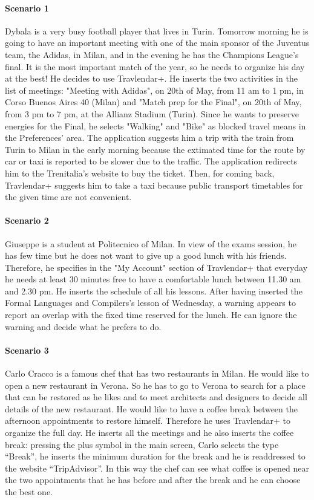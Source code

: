\documentclass[12pt,titlepage]{article}
\begin{document}
\paragraph{Scenario 1} 
Dybala is a very busy football player that lives in Turin. Tomorrow morning he is going to have an important meeting with one of the main sponsor of the Juventus team, the Adidas, in Milan, and in the evening he has the Champions League's final. It is the most important match of the year, so he needs to organize his day at the best! He decides to use Travlendar+. He inserts the two activities in the list of meetings: "Meeting with Adidas", on 20th of May, from 11 am to 1 pm, in Corso Buenos Aires 40 (Milan) and "Match prep for the Final", on 20th of May, from 3 pm to 7 pm, at the Allianz Stadium (Turin). Since he wants to preserve energies for the Final, he selects "Walking" and "Bike" as blocked travel means in the Preferences' area. The application suggests him a trip with the train from Turin to Milan in the early morning because the extimated time for the route by car or taxi is reported to be slower due to the traffic. The application redirects him to the Trenitalia's website to buy the ticket. Then, for coming back, Travlendar+ suggests him to take a taxi because public transport timetables for the given time are not convenient. 

\paragraph{Scenario 2}
Giuseppe is a student at Politecnico of Milan. In view of the exams session, he has few time but he does not want to give up a good lunch with his friends. Therefore, he specifies in the "My Account" section of Travlendar+ that everyday he needs at least 30 minutes free to have a comfortable lunch between 11.30 am and 2.30 pm. He inserts the schedule of all his lessons. After having inserted the Formal Languages and Compilers's lesson of Wednesday, a warning appears to report an overlap with the fixed time reserved for the lunch. He can ignore the warning and decide what he prefers to do.

\paragraph{Scenario 3}
Carlo Cracco is a famous chef that has two restaurants in Milan. He would like to open a new restaurant in Verona. So he has to go to Verona to search for a place that can be restored as he likes and to meet architects and designers to decide all details of the new restaurant. He would like to have a coffee break between the afternoon appointments to restore himself. Therefore he uses Travlendar+ to organize the full day. He inserts all the meetings and he also inserts the coffee break: pressing the plus symbol in the main screen, Carlo selects the type ``Break'', he inserts the minimum duration for the break and he is readdressed to the website ``TripAdvisor''. In this way the chef can see what coffee is opened near the two appointments that he has before and after the break and he can choose the best one.
\end{document}

